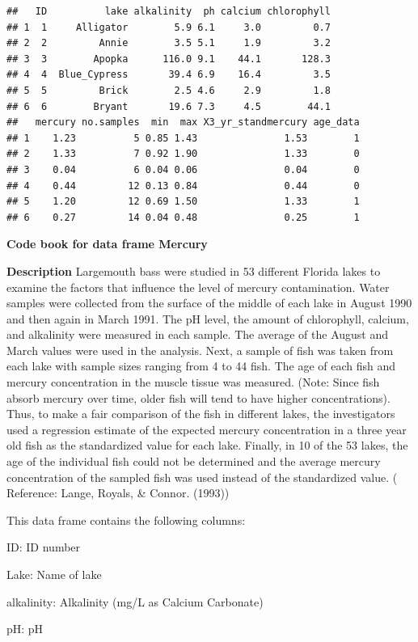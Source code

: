 \documentclass[
]{book}
\begin{document}
\begin{verbatim}
##   ID          lake alkalinity  ph calcium chlorophyll
## 1  1     Alligator        5.9 6.1     3.0         0.7
## 2  2         Annie        3.5 5.1     1.9         3.2
## 3  3        Apopka      116.0 9.1    44.1       128.3
## 4  4  Blue_Cypress       39.4 6.9    16.4         3.5
## 5  5         Brick        2.5 4.6     2.9         1.8
## 6  6        Bryant       19.6 7.3     4.5        44.1
##   mercury no.samples  min  max X3_yr_standmercury age_data
## 1    1.23          5 0.85 1.43               1.53        1
## 2    1.33          7 0.92 1.90               1.33        0
## 3    0.04          6 0.04 0.06               0.04        0
## 4    0.44         12 0.13 0.84               0.44        0
## 5    1.20         12 0.69 1.50               1.33        1
## 6    0.27         14 0.04 0.48               0.25        1
\end{verbatim}

\textbf{Code book for data frame Mercury}

\textbf{Description}
Largemouth bass were studied in 53 different Florida lakes to examine the factors that influence the level of mercury contamination. Water samples were collected from the surface of the middle of each lake in August 1990 and then again in March 1991. The pH level, the amount of chlorophyll, calcium, and alkalinity were measured in each sample. The average of the August and March values were used in the analysis. Next, a sample of fish was taken from each lake with sample sizes ranging from 4 to 44 fish. The age of each fish and mercury concentration in the muscle tissue was measured. (Note: Since fish absorb mercury over time, older fish will tend to have higher concentrations). Thus, to make a fair comparison of the fish in different lakes, the investigators used a regression estimate of the expected mercury concentration in a three year old fish as the standardized value for each lake. Finally, in 10 of the 53 lakes, the age of the individual fish could not be determined and the average mercury concentration of the sampled fish was used instead of the standardized value. ( Reference: Lange, Royals, \& Connor. (1993))

This data frame contains the following columns:

ID: ID number

Lake: Name of lake

alkalinity: Alkalinity (mg/L as Calcium Carbonate)

pH: pH
\end{document}
